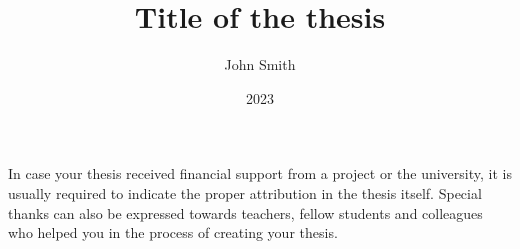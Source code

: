 \documentclass[
]{elteikthesis}[2023/04/10]
\title{Title of the thesis} %
\date{2023} %
\author{John Smith}
\affiliation{Assistant Lecturer} %
\begin{document}


\maketitle

%

\tableofcontents
\cleardoublepage


\cleardoublepage


\cleardoublepage


\cleardoublepage


\cleardoublepage

\chapter*{\acklabel}
In case your thesis received financial support from a project or the university, it is usually required to indicate the proper attribution in the thesis itself. Special thanks can also be expressed towards teachers, fellow students and colleagues who helped you in the process of creating your thesis.

%

\cleardoublepage
\end{document}

